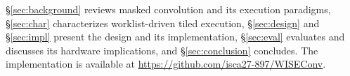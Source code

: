 \S\ref{sec:background} reviews masked convolution and its execution
paradigms, \S\ref{sec:char} characterizes worklist-driven tiled execution,
\S\ref{sec:design} and \S\ref{sec:impl} present the design and its
implementation, \S\ref{sec:eval} evaluates \sysname and discusses its
hardware implications, and \S\ref{sec:conclusion} concludes.
The implementation is available at \url{https://github.com/isca27-897/WISEConv}.
